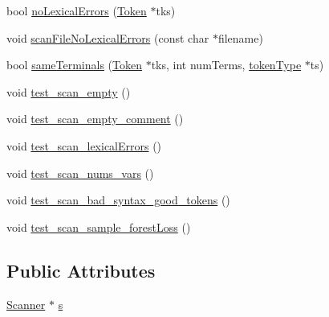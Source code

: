\begin{DoxyCompactItemize}
\item 
bool \hyperlink{classScannerTestSuite_a681db679ec2418f862f478fa7678942b}{no\-Lexical\-Errors} (\hyperlink{classToken}{Token} $\ast$tks)
\item 
void \hyperlink{classScannerTestSuite_a01dc6065a02127accc049627ae234129}{scan\-File\-No\-Lexical\-Errors} (const char $\ast$filename)
\item 
bool \hyperlink{classScannerTestSuite_a97c50725866b3a5b36c36488053a59bc}{same\-Terminals} (\hyperlink{classToken}{Token} $\ast$tks, int num\-Terms, \hyperlink{scanner_8h_ab7f9b765cab7ed98e5a7f05690f6a061}{token\-Type} $\ast$ts)
\item 
void \hyperlink{classScannerTestSuite_a01beafb44a33f4d80baf9a4208919c07}{test\-\_\-scan\-\_\-empty} ()
\item 
void \hyperlink{classScannerTestSuite_a304719dd961df0714d372010cdf99ef1}{test\-\_\-scan\-\_\-empty\-\_\-comment} ()
\item 
void \hyperlink{classScannerTestSuite_af85168e66ba2b924488aca9768231367}{test\-\_\-scan\-\_\-lexical\-Errors} ()
\item 
void \hyperlink{classScannerTestSuite_a4bd4d5fc2218f3d28b08b2821ecc271b}{test\-\_\-scan\-\_\-nums\-\_\-vars} ()
\item 
void \hyperlink{classScannerTestSuite_aad7648d262ef3c103f0792ef73aa3bd8}{test\-\_\-scan\-\_\-bad\-\_\-syntax\-\_\-good\-\_\-tokens} ()
\item 
void \hyperlink{classScannerTestSuite_a8248f8bda6c9909971ef13f1364ab8f8}{test\-\_\-scan\-\_\-sample\-\_\-forest\-Loss} ()
\end{DoxyCompactItemize}
\subsection*{Public Attributes}
\begin{DoxyCompactItemize}
\item 
\hyperlink{classScanner}{Scanner} $\ast$ \hyperlink{classScannerTestSuite_a39987f3459098101d7c7fb5a4492996d}{s}
\end{DoxyCompactItemize}


